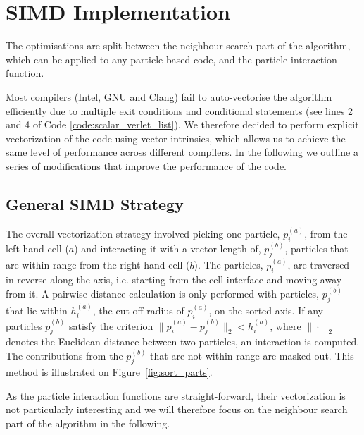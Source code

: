 \documentclass{IOS-Book-Article}
\begin{document}
\section{SIMD Implementation}
\label{sec:simd_implementation}

The optimisations are split between the neighbour search part of the algorithm, which can be applied to any particle-based code, and the particle interaction function. 

Most compilers (Intel, GNU and Clang) fail to auto-vectorise the algorithm efficiently due to multiple exit conditions and conditional statements (see lines 2 and 4 of Code \ref{code:scalar_verlet_list}). We therefore decided to perform explicit vectorization of the code using vector intrinsics\cite{ref:intel_intrinsics_guide}, which allows us to achieve the same level of performance across different compilers. In the following we outline a series of modifications that improve the performance of the code. 

\subsection{General SIMD Strategy}

The overall vectorization strategy involved picking one particle, $p^{(a)}_i$, from the left-hand cell ($a$) and interacting it with a vector length of, $p^{(b)}_j$, particles that are within range from the right-hand cell ($b$). The particles, $p^{(a)}_i$, are traversed in reverse along the axis, i.e. starting from the cell interface and moving away from it. A pairwise distance calculation is only performed with particles, $p^{(b)}_j$ that lie within $h^{(a)}_i$, the cut-off radius of $p^{(a)}_i$, on the sorted axis. If any particles $p^{(b)}_j$ satisfy the criterion $\|p^{(a)}_i - p^{(b)}_j\|_2 < h^{(a)}_i$, where $\|\cdot\|_2$ denotes the Euclidean distance between two particles, an interaction is computed. The contributions from the $p^{(b)}_j$ that are not within range are masked out. This method is illustrated on Figure~\ref{fig:sort_parts}.

As the particle interaction functions are straight-forward, their vectorization is not particularly interesting and we will therefore focus on the neighbour search part of the algorithm in the following.
\end{document}
